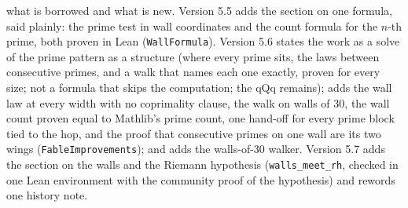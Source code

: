 \documentclass[11pt]{article}
\begin{document}
what is borrowed and what is new. Version 5.5 adds the section on one formula, said plainly: the prime test in wall coordinates and the count formula for the $n$-th prime, both proven in Lean (\texttt{WallFormula}). Version 5.6 states the work as a solve of the prime pattern as a structure (where every prime sits, the laws between consecutive primes, and a walk that names each one exactly, proven for every size; not a formula that skips the computation; the qQq remains); adds the wall law at every width with no coprimality clause, the walk on walls of $30$, the wall count proven equal to Mathlib's prime count, one hand-off for every prime block tied to the hop, and the proof that consecutive primes on one wall are its two wings (\texttt{FableImprovements}); and adds the walls-of-$30$ walker. Version 5.7 adds the section on the walls and the Riemann hypothesis (\texttt{walls\_meet\_rh}, checked in one Lean environment with the community proof of the hypothesis) and rewords one history note.
\end{document}
